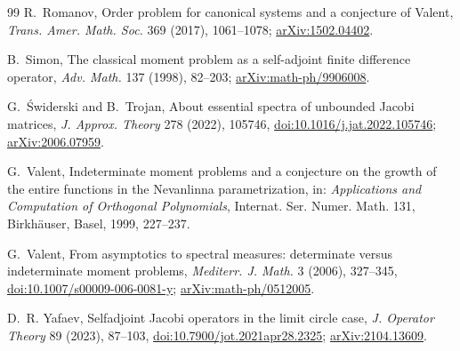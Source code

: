 \begin{thebibliography}{99}
R.~Romanov, Order problem for canonical systems and a conjecture of Valent, \emph{Trans. Amer.
Math. Soc.} 369 (2017), 1061--1078; \href{https://arxiv.org/abs/1502.04402}{arXiv:1502.04402}.

B.~Simon, The classical moment problem as a self-adjoint finite difference operator,
\emph{Adv. Math.} 137 (1998), 82--203; \href{https://arxiv.org/abs/math-ph/9906008}{arXiv:math-ph/9906008}.

G.~\'Swiderski and B.~Trojan, About essential spectra of unbounded Jacobi matrices,
\emph{J. Approx. Theory} 278 (2022), 105746,
\href{https://doi.org/10.1016/j.jat.2022.105746}{doi:10.1016/j.jat.2022.105746};
\href{https://arxiv.org/abs/2006.07959}{arXiv:2006.07959}.

G.~Valent, Indeterminate moment problems and a conjecture on the growth of the entire
functions in the Nevanlinna parametrization, in: \emph{Applications and Computation of
Orthogonal Polynomials}, Internat. Ser. Numer. Math. 131, Birkh\"auser, Basel, 1999, 227--237.

G.~Valent, From asymptotics to spectral measures: determinate versus indeterminate moment
problems, \emph{Mediterr. J. Math.} 3 (2006), 327--345,
\href{https://doi.org/10.1007/s00009-006-0081-y}{doi:10.1007/s00009-006-0081-y};
\href{https://arxiv.org/abs/math-ph/0512005}{arXiv:math-ph/0512005}.

D.~R. Yafaev, Selfadjoint Jacobi operators in the limit circle case, \emph{J. Operator Theory}
89 (2023), 87--103, \href{https://doi.org/10.7900/jot.2021apr28.2325}{doi:10.7900/jot.2021apr28.2325};
\href{https://arxiv.org/abs/2104.13609}{arXiv:2104.13609}.

\end{thebibliography}
